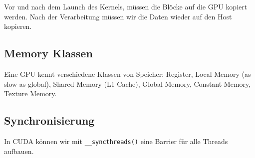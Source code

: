 Vor und nach dem Launch des Kernels, müssen die Blöcke auf die GPU kopiert werden. Nach der Verarbeitung müssen wir die Daten wieder auf den Host kopieren.

\subsection{Memory Klassen}
Eine GPU kennt verschiedene Klassen von Speicher: Register, Local Memory (as slow as global), Shared Memory (L1 Cache), Global Memory, Constant Memory, Texture Memory.

\subsection{Synchronisierung}
In CUDA können wir mit \lstinline|__syncthreads()| eine Barrier für alle Threads aufbauen.

